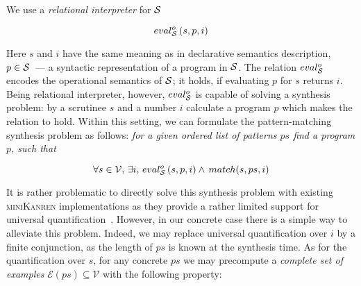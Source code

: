 \begin{comment}

Algebraic data types are essential for typed functional programming and it's difficult to imagine effective compiler without effective compilation of pattern matching. 
There are a few different approaches for compiling pattern mathcing. GHC is using influential paper~\cite{Jones1987}, OCaml is currently based on~\cite{maranget2001} although a work~\cite{maranget2008} can slightly improve effectiveness of generated code. 

Also there are a number of possible extensions of pattern matching itself (guards, non-linear patterns, active patterns) and extensions of possible matchable values (polymorphic variants in OCaml, for example). Although having all these extensions can be helpful for programming in practice, they can complicate compilation schema or make it very difficult to generate effective code. Supporting a large number  of extensions can seriously complicate compiler's implementation too.

We present an approach to pattern matching code generation based on application of relational programming~\cite{TRS,WillThesis} and, in
 particular, relational interpreters~\cite{unified}. We expect that our approach can compile pattern mathcing to competitive code and will be easier to support during adding of new pattern matching extensions.
 
\end{comment}
 We use a \emph{relational interpreter} for $\mathcal{S}$
 
 \[
 eval^o_{\mathcal{S}}\, (s, p, i)
 \]
 
 Here $s$ and $i$ have the same meaning as in declarative semantics description, $p\in\mathcal{S}$~--- a syntactic representation of
 a program in $\mathcal{S}$. The relation $eval^o_{\mathcal{S}}$ encodes the operational semantics of $\mathcal{S}$; it holds, if
 evaluating $p$ for $s$ returns $i$. Being relational interpreter, however, $eval^o_{\mathcal{S}}$ is capable of solving a
 synthesis problem: by a scrutinee $s$ and a number $i$ calculate a program $p$ which makes the relation to hold.
 Within this setting, we can formulate the pattern-matching synthesis problem as follows: \emph{for a given ordered list of patterns $ps$ find a program $p$, such that}
 
 \[
 \forall s\in\mathcal{V},\,\exists i,\,eval^o_{\mathcal{S}}\, (s, p, i) \wedge\, match (s, ps, i)
 \]
 
 It is rather problematic to directly solve this synthesis problem with existing \textsc{miniKanren} implementations as
 they provide a rather limited support for universal quantification~\cite{eigen,moiseenko}. However, in our concrete
 case there is a simple way to alleviate this problem. Indeed, we may replace universal quantification over $i$ by
 a finite conjunction, as the length of $ps$ is known at the synthesis time. As for the quantification over $s$, for
 any concrete $ps$ we may precompute a \emph{complete set of examples} $\mathcal{E}(ps)\subseteq\mathcal{V}$ with the following
 property:
 
